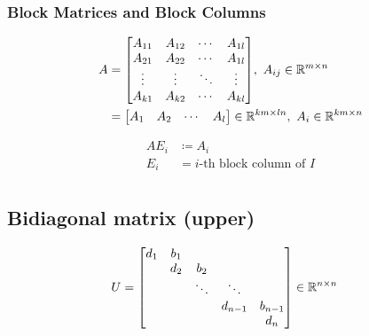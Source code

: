 \documentclass[11pt]{article}
\begin{document}
\subsubsection*{Block Matrices and Block Columns}

\begin{align*}
    A &= \mqty[
        A_{11} & A_{12} & \cdots & A_{1l} \\
        A_{21} & A_{22} & \cdots & A_{1l} \\
        \vdots & \vdots & \ddots & \vdots \\
        A_{k1} & A_{k2} & \cdots & A_{kl}
        ],\ A_{ij} \in \mathbb{R}^{m \times n} \\
    &= \mqty[
        A_{1} & A_{2} & \cdots & A_{l}
        ]
    \in \mathbb{R}^{km \times ln}
    ,\ A_{i} \in \mathbb{R}^{km \times n}
\end{align*}


\begin{align*}
    AE_{i} &\coloneqq A_{i}\\
    E_{i} &= i\text{-th block column of }I\\
\end{align*}



\subsection{Bidiagonal matrix (upper)}





\begin{align*}
    U &= \mqty[
        d_{1} & b_{1} &   &   &  \\
          & d_{2} & b_{2} &   &  \\
          &   & \ddots & \ddots &  \\
          &   &   & d_{n-1} & b_{n-1}\\
          &   &   &   & d_{n}
    ] \in \mathbb{R}^{n \times n}
\end{align*}
\end{document}
